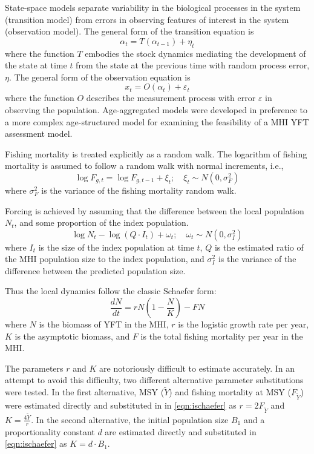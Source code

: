 \documentclass[12pt,letterpaper,twoside]{article}
\newcommand\MSY{\tilde{Y}}
\newcommand\Fmsy{F_{\MSY}}
\begin{document}
State-space models separate variability in the biological
processes in the system (transition model)
from errors in observing features of interest
in the system (observation model). 
The general form of the transition equation is
\begin{equation}
\alpha_t=T(\alpha_{t-1}) + \eta_t
\end{equation}
where the function $T$ embodies the stock dynamics mediating the
development of the state at time $t$ from the state at the previous
time with random process error, $\eta$.
The general form of the observation equation is
\begin{equation}
x_t = O(\alpha_t) + \varepsilon_t
\end{equation}
where the function $O$ describes the measurement process with
error $\varepsilon$ in observing the population.
Age-aggregated models were developed in preference to a more complex
age-structured model for examining the feasibility of a MHI YFT
assessment model.

Fishing mortality is treated explicitly as a random
walk.  The logarithm of fishing
mortality is assumed to
follow a random walk with normal increments, i.e.,
\begin{equation}
\log F_{g,t} = \log F_{g,t-1} + \xi_t;\quad \xi_t\sim
N(0,\sigma^2_F) \label{eqn:Fwalk}
\end{equation}
where  $\sigma^2_F$ is the variance of the fishing
mortality random walk.

Forcing is achieved by assuming that the difference between the local
population $N_t$, and some proportion of the index population.
\begin{equation}
\log N_t - \log (Q\cdot I_t) + \omega_t;\quad \omega_t\sim N(0,\sigma^2_I)
\label{eqn:index}
\end{equation}
where
$I_t$ is the size of the index population at time $t$,
$Q$ is the estimated ratio of the MHI population size to the index
population,
and $\sigma^2_I$ is the variance of the difference between the
predicted population size.


Thus the local dynamics follow the classic Schaefer form:
\begin{equation}
\label{eqn:ischaefer}
\frac{dN}{dt} = rN(1-\frac{N}{K}) - FN
\end{equation}
where $N$ is the biomass of YFT in the MHI, 
$r$ is the logistic growth rate per year,
$K$ is the asymptotic biomass, and
$F$ is the total fishing mortality per year in the MHI.

The parameters $r$ and $K$ are notoriously difficult to estimate
accurately. In an attempt to avoid this difficulty, two different
alternative parameter substitutions were tested. In the first
alternative, MSY ($\MSY$) and fishing mortality at MSY ($\Fmsy$) were
estimated directly and substituted in in \ref{eqn:ischaefer} as
$r=2F_{\MSY}$ and $K=\frac{4\MSY}{r}$.
In the second alternative, the initial population size $B_1$ and a
proportionality constant $d$ are estimated directly and substituted in
\ref{eqn:ischaefer} as $K=d\cdot B_1$.
\end{document}
